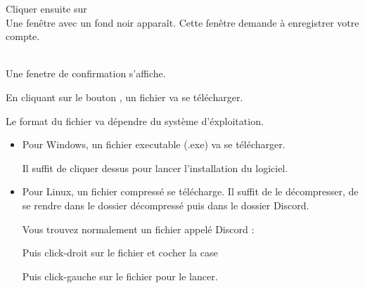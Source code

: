 
Cliquer ensuite sur  \\


Une fenêtre avec un fond noir apparaît. Cette fenêtre demande à enregistrer votre compte. \\





 \\

Une fenetre de confirmation s'affiche. 



En cliquant sur le bouton , un fichier va se télécharger.

Le format du fichier va dépendre du système d'éxploitation.

\begin{itemize}
	\item Pour Windows, un fichier executable (.exe) va se télécharger. 


	Il suffit de cliquer dessus pour lancer l'installation du logiciel.

	\item Pour Linux, un fichier compressé se télécharge. Il suffit de le décompresser, de se rendre dans le dossier décompressé puis dans le dossier Discord. \\


	Vous trouvez normalement un fichier appelé Discord :


	Puis click-droit sur le fichier   et cocher la case 


	Puis click-gauche sur le fichier  pour le lancer.
\end{itemize}

